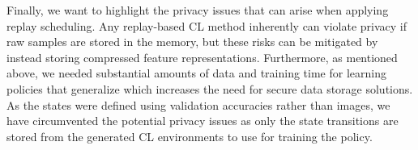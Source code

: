 Finally, we want to highlight the privacy issues that can arise when applying replay scheduling. Any replay-based CL method inherently can violate privacy if raw samples are stored in the memory, but these risks can be mitigated by instead storing compressed feature representations. Furthermore, as mentioned above, we needed substantial amounts of data and training time for learning policies that generalize which increases the need for secure data storage solutions. As the states were defined using validation accuracies rather than images, we have circumvented the potential privacy issues as only the state transitions are stored from the generated CL environments to use for training the policy.  

